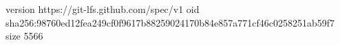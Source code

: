 version https://git-lfs.github.com/spec/v1
oid sha256:98760ed12fea249cf0f9617b88259024170b84e857a771cf46c0258251ab59f7
size 5566
